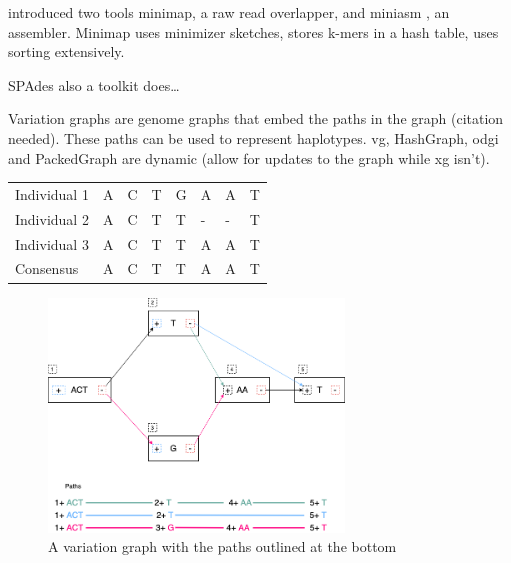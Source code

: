 \documentclass[10pt, a4paper]{article}
\begin{document}
\cite{liMinimapMiniasmFast2016} introduced two tools minimap, a raw read
overlapper, and miniasm \cite{liMinimapMiniasmFast2016}, an assembler.
Minimap uses minimizer sketches, stores k-mers in a hash table, uses sorting
extensively.

SPAdes also a toolkit does…

\newpage
Variation graphs are genome graphs that embed the paths in the graph
(citation needed).
These paths can be used to represent haplotypes. vg, HashGraph, odgi and
PackedGraph are dynamic (allow for updates to the graph while xg isn’t).


\begin{center}
\begin{tabular}{llllllll}
\color{mypink}Individual 1 & \color{mypink} A & \color{mypink} C & \color{mypink} T & \color{mypink} G & \color{mypink} A & \color{mypink} A & \color{mypink} T\\
\color{myblue}Individual 2 & \color{myblue} A & \color{myblue} C & \color{myblue} T & \color{myblue} T & \color{myblue} - & \color{myblue} - & \color{myblue} T\\
\color{mygreen}Individual 3 & \color{mygreen} A & \color{mygreen} C & \color{mygreen} T & \color{mygreen} T & \color{mygreen} A & \color{mygreen} A & \color{mygreen} T\\
\hline
\color{red}Consensus & \color{red} A & \color{red} C & \color{red} T & \color{red} T & \color{red} A & \color{myred} A & \color{red} T\\
\end{tabular}
\end{center}

\begin{figure}[H]
\centering
\includegraphics[width=0.7\textwidth]{figures/Variation Graph-Page-1.png}
\caption{A variation graph with the paths outlined at the bottom}\label{no struct}
\end{figure}
\end{document}
